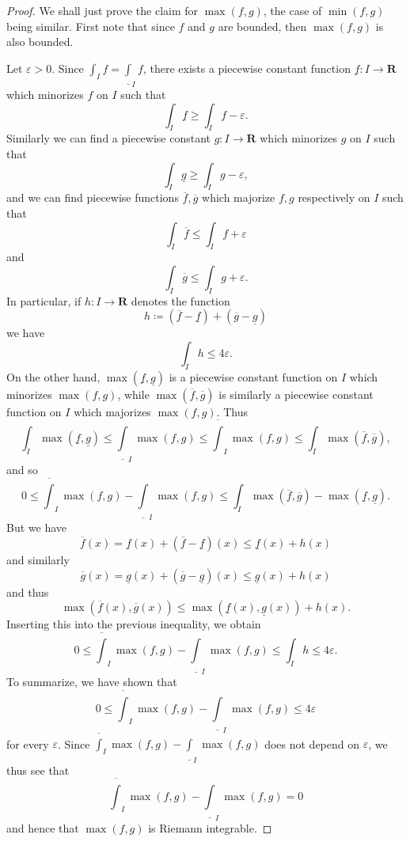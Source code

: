 \begin{proof}
    We shall just prove the claim for \(\max(f, g)\), the case of \(\min(f, g)\) being similar.
    First note that since \(f\) and \(g\) are bounded, then \(\max(f, g)\) is also bounded.

    Let \(\varepsilon > 0\).
    Since \(\int_I f = \underline{\int}_I f\), there exists a piecewise constant function \(\underline{f} : I \to \mathbf{R}\) which minorizes \(f\) on \(I\) such that
    \[
        \int_I \underline{f} \geq \int_I f - \varepsilon.
    \]
    Similarly we can find a piecewise constant \(g : I \to \mathbf{R}\) which minorizes \(g\) on \(I\) such that
    \[
        \int_I \underline{g} \geq \int_I g - \varepsilon,
    \]
    and we can find piecewise functions \(\overline{f}, \overline{g}\) which majorize \(f, g\) respectively on \(I\) such that
    \[
        \int_I \overline{f} \leq \int_I f + \varepsilon
    \]
    and
    \[
        \int_I \overline{g} \leq \int_I g + \varepsilon.
    \]
    In particular, if \(h : I \to \mathbf{R}\) denotes the function
    \[
        h \coloneqq (\overline{f} - \underline{f}) + (\overline{g} - \underline{g})
    \]
    we have
    \[
        \int_I h \leq 4 \varepsilon.
    \]
    On the other hand, \(\max(\underline{f}, \underline{g})\) is a piecewise constant function on \(I\) which minorizes \(\max(f, g)\), while \(\max(\overline{f}, \overline{g})\) is similarly a piecewise constant function on \(I\) which majorizes \(\max(f, g)\).
    Thus
    \[
        \int_I \max(\underline{f}, \underline{g}) \leq \underline{\int}_I \max(f, g) \leq \overline{\int}_I \max(f, g) \leq \int_I \max(\overline{f}, \overline{g}),
    \]
    and so
    \[
        0 \leq \overline{\int}_I \max(f, g) - \underline{\int}_I \max(f, g) \leq \int_I \max(\overline{f}, \overline{g}) - \max(\underline{f}, \underline{g}).
    \]
    But we have
    \[
        \overline{f}(x) = \underline{f}(x) + (\overline{f} - \underline{f})(x) \leq \underline{f}(x) + h(x)
    \]
    and similarly
    \[
        \overline{g}(x) = \underline{g}(x) + (\overline{g} - \underline{g})(x) \leq \underline{g}(x) + h(x)
    \]
    and thus
    \[
        \max(\overline{f}(x), \overline{g}(x)) \leq \max(\underline{f}(x), \underline{g}(x)) + h(x).
    \]
    Inserting this into the previous inequality, we obtain
    \[
        0 \leq \overline{\int}_I \max(f, g) - \underline{\int}_I \max(f, g) \leq \int_I h \leq 4 \varepsilon.
    \]
    To summarize, we have shown that
    \[
        0 \leq \overline{\int}_I \max(f, g) - \underline{\int}_I \max(f, g) \leq 4 \varepsilon
    \]
    for every \(\varepsilon\).
    Since \(\overline{\int}_I \max(f, g) - \underline{\int}_I \max(f, g)\) does not depend on \(\varepsilon\), we thus see that
    \[
        \overline{\int}_I \max(f, g) - \underline{\int}_I \max(f, g) = 0
    \]
    and hence that \(\max(f, g)\) is Riemann integrable.
\end{proof}

